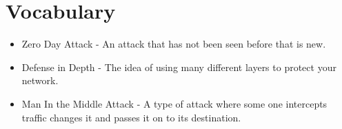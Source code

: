 \documentclass[letterpaper, onecolumn,10pt]{IEEEtran}
\begin{document}
		        
		        
		        
		\section{Vocabulary}
		    \begin{itemize}
		        \item Zero Day Attack - An attack that has not been seen before that is new.\\
		        \item Defense in Depth - The idea of using many different layers to protect your network.\\
		        \item Man In the Middle Attack - A type of attack where some one intercepts traffic changes it and passes it on to its destination.\\
		    \end{itemize}
			
		
		
\end{document}
